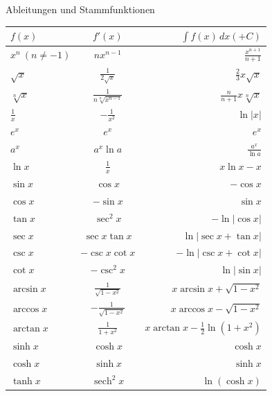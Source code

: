 \begin{minipage}{\linewidth}
\Tab Ableitungen und Stammfunktionen

\begin{tabular}{l c r}
    $f(x)$ & $f'(x)$ & $\int f(x) \, dx (+ C)$ \\
    \hline
    $x^n \ (n \neq -1)$ & $n x^{n-1}$ & $\frac{x^{n+1}}{n+1}$ \\[1ex]
    $\sqrt{x}$ & $\frac{1}{2\sqrt{x}}$ & $\frac{2}{3}x\sqrt{x}$ \\[1ex]
    $\sqrt[n]{x}$ & $\frac{1}{n\sqrt[n]{x^{n-1}}}$ & $\frac{n}{n+1}x\sqrt[n]{x}$ \\[1ex]
    $\frac{1}{x}$ & $-\frac{1}{x^2}$ & $\ln|x|$ \\[1ex]
    $e^x$ & $e^x$ & $e^x$ \\[1ex]
    $a^x$ & $a^x \ln a$ & $\frac{a^x}{\ln a}$ \\[1ex]
    $\ln x$ & $\frac{1}{x}$ & $x \ln x - x$ \\[0.5ex]
    \hline
    $\sin x$ & $\cos x$ & $-\cos x$ \\[1ex]
    $\cos x$ & $-\sin x$ & $\sin x$ \\[1ex]
    $\tan x$ & $\sec^2 x$ & $-\ln|\cos x|$ \\[1ex]
    $\sec x$ & $\sec x \tan x$ & $\ln|\sec x + \tan x|$ \\[1ex]
    $\csc x$ & $-\csc x \cot x$ & $-\ln|\csc x + \cot x|$ \\[1ex]
    $\cot x$ & $-\csc^2 x$ & $\ln|\sin x|$ \\
    \hline
    $\arcsin x$ & $\frac{1}{\sqrt{1-x^2}}$ & $x \arcsin x + \sqrt{1-x^2}$ \\[1ex]
    $\arccos x$ & $-\frac{1}{\sqrt{1-x^2}}$ & $x \arccos x - \sqrt{1-x^2}$ \\[1ex]
    $\arctan x$ & $\frac{1}{1+x^2}$ & $x \arctan x - \frac{1}{2}\ln(1+x^2)$ \\[0.5ex]
    \hline
    $\sinh x$ & $\cosh x$ & $\cosh x$ \\[1ex]
    $\cosh x$ & $\sinh x$ & $\sinh x$ \\[1ex]
    $\tanh x$ & $\operatorname{sech}^2 x$ & $\ln(\cosh x)$ \\
\end{tabular}
\end{minipage}
